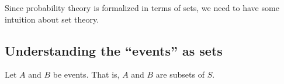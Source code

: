 \documentclass[10pt]{article}
\theoremstyle{definition}
\newcommand{\1}[1]{\textbf{1}_{\left[#1\right]}} %
\begin{document}
Since probability theory is formalized in terms of sets, we need to have some intuition about set theory.


\subsection{Understanding the  ``events'' as sets}


Let $A$ and $B$ be events. That is, $A$ and $B$ are subsets of $S$.
\end{document}

